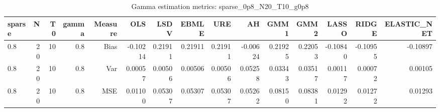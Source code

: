 \begin{table}[!htbp]\centering
\caption{Gamma estimation metrics: sparse_0p8_N20_T10_g0p8}
\label{tab:table1_sparse_0p8_N20_T10_g0p8}
\begin{tabular}{lrrrrrrrrrrrrrr}
\hline
sparse & N & T0 & gamma & Measure & OLS & LSDV & EBMLE & URE & AH & GMM1 & GMM2 & LASSO & RIDGE & ELASTIC_NET \\
\hline
0.8 & 20 & 10 & 0.8 & Bias & -0.10214 & 0.21911 & 0.21911 & 0.21911 & -0.00624 & 0.21925 & 0.22053 & -0.10840 & -0.10955 & -0.10897 \\
0.8 & 20 & 10 & 0.8 & Var & 0.00057 & 0.00506 & 0.00506 & 0.00506 & 0.05258 & 0.03343 & 0.03517 & 0.00117 & 0.00072 & 0.00105 \\
0.8 & 20 & 10 & 0.8 & MSE & 0.01100 & 0.05307 & 0.05307 & 0.05307 & 0.05262 & 0.08150 & 0.08381 & 0.01292 & 0.01272 & 0.01293 \\
\hline
\end{tabular}
\end{table}

